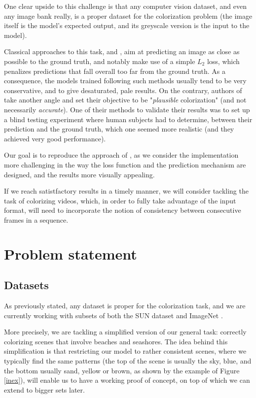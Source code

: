 \documentclass[10pt,twocolumn,letterpaper]{article}
\begin{document}
One clear upside to this challenge is that any computer vision dataset, and even any image bank really, is a proper dataset for the colorization problem (the image itself is the model's expected output, and its greyscale version is the input to the model).

Classical approaches to this task, \eg \cite{cheng2015deep} and \cite{dahl2016tinyclouds}, aim at predicting an image as close as possible to the ground truth, and notably make use of a simple $L_2$ loss, which penalizes predictions that fall overall too far from the ground truth. As a consequence, the models trained following such methods usually tend to be very conservative, and to give desaturated, pale results.
On the contrary, authors of \cite{zhang2016colorful} take another angle and set their objective to be "\textit{plausible} colorization" (and not necessarily \textit{accurate}). One of their methods to validate their results was to set up a blind testing experiment where human subjects had to determine, between their prediction and the ground truth, which one seemed more realistic (and they achieved very good performance).

Our goal is to reproduce the approach of \cite{zhang2016colorful}, as we consider the implementation more challenging in the way the loss function and the prediction mechanism are designed, and the results more visually appealing.

If we reach satistfactory results in a timely manner, we will consider tackling the task of colorizing videos, which, in order to fully take advantage of the input format, will need to incorporate the notion of consistency between consecutive frames in a sequence.

\section{Problem statement}

\subsection{Datasets}

As previously stated, any dataset is proper for the colorization task, and we are currently working with subsets of both the SUN dataset \cite{xiao2010sun} and ImageNet \cite{russakovsky2015imagenet}.

More precisely, we are tackling a simplified version of our general task: correctly colorizing scenes that involve beaches and seashores. The idea behind this simplification is that restricting our model to rather consistent scenes, where we typically find the same patterns (the top of the scene is usually the sky, \ie blue, and the bottom usually sand, \ie yellow or brown, as shown by the example of Figure \ref{inex}), will enable us to have a working proof of concept, on top of which we can extend to bigger sets later.
\end{document}
